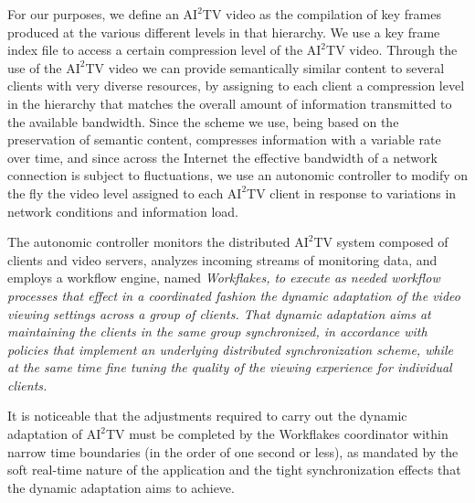 \documentclass{sig-alternate}
\begin{document}
For our purposes, we define an $\mathrm{AI}^2$TV video as the
compilation of key frames produced at the various different levels in
that hierarchy.  We use a key frame index file to access a certain
compression level of the $\mathrm{AI}^2$TV video.  Through the use of
the $\mathrm{AI}^2$TV video we can provide semantically similar
content to several clients with very diverse resources, by assigning
to each client a compression level in the hierarchy that matches the
overall amount of information transmitted to the available bandwidth.
Since the scheme we use, being based on the preservation of semantic
content, compresses information with a variable rate over time, and
since across the Internet the effective bandwidth of a network
connection is subject to fluctuations, we use an autonomic controller
to modify on the fly the video level assigned to each
$\mathrm{AI}^2$TV client in response to variations in network
conditions and information load.

The autonomic controller monitors the distributed $\mathrm{AI}^2$TV
system composed of clients and video servers, analyzes incoming
streams of monitoring data, and employs a workflow engine, named
\em{Workflakes}\cite{PEPPO}, to execute as needed workflow processes
that effect in a coordinated fashion the \em{dynamic adaptation} of
the video viewing settings across a group of clients.  That dynamic
adaptation aims at maintaining the clients in the same group
synchronized, in accordance with policies that implement an underlying
distributed synchronization scheme, while at the same time fine tuning
the quality of the viewing experience for individual clients.

It is noticeable that the adjustments required to carry out the
dynamic adaptation of $\mathrm{AI}^2$TV must be completed by the
Workflakes coordinator within narrow time boundaries (in the order of
one second or less), as mandated by the soft real-time nature of the
application and the tight synchronization effects that the dynamic
adaptation aims to achieve.

\end{document}
